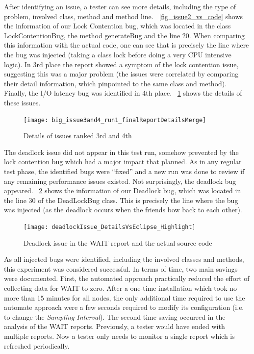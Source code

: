 \documentclass[runningheads,a4paper]{llncs}
\begin{document}
After identifying an issue, a tester can see more details, including the type of
problem, involved class, method and method line. \figurename
~\ref{fig_issue2_vs_code} shows the information of our Lock Contention bug,
which was located in the class LockContentionBug, the method generateBug and the
line 20. When comparing this information with the actual code, one can see that
is precisely the line where the bug was injected (taking a class lock before
doing a very CPU intensive logic). In 3rd place the report showed a symptom of
the lock contention issue, suggesting this was a major problem (the issues were correlated 
by comparing their detail information, which pinpointed to the same class and
method). Finally, the I/O latency bug was identified in 4th place. \figurename
~\ref{fig_issues34} shows the details of these issues.

\begin{figure}[!h]
\centering
\texttt{[image: big\_issue3and4\_run1\_finalReportDetailsMerge]}
\caption{Details of issues ranked 3rd and 4th}
\label{fig_issues34}
\end{figure}

The deadlock issue did not appear in this test run, somehow prevented by the
lock contention bug which had a major impact that planned. As in any regular
test phase, the identified bugs were ``fixed'' and a new run was done to review
if any remaining performance issues existed. Not surprisingly, the deadlock bug
appeared. \figurename ~\ref{fig_dlissue_vs_code} shows the information of our
Deadlock bug, which was located in the line 30 of the DeadLockBug class. This is
precisely the line where the bug was injected (as the deadlock occurs when the
friends bow back to each other).
\vspace{-5pt}
\begin{figure}[!h]
\centering
\texttt{[image: deadlockIssue\_DetailsVsEclipse\_Highlight]}
\caption{Deadlock issue in the WAIT report and the actual source code}
\label{fig_dlissue_vs_code}
\end{figure}
\vspace{-5pt}

As all injected bugs were identified, including the involved classes and
methods, this experiment was considered successful. In terms of time, two main
savings were documented. First, the automated approach practically reduced the
effort of collecting data for WAIT to zero. After a one-time installation which
took no more than 15 minutes for all nodes, the only additional time required to 
use the automate approach were a few seconds required to modify its configuration
(i.e. to change the \emph{Sampling Interval}). The second time saving occurred
in the analysis of the WAIT reports. Previously, a tester would have ended with
multiple reports. Now a tester only needs to monitor a single report which is 
refreshed periodically.
\end{document}
